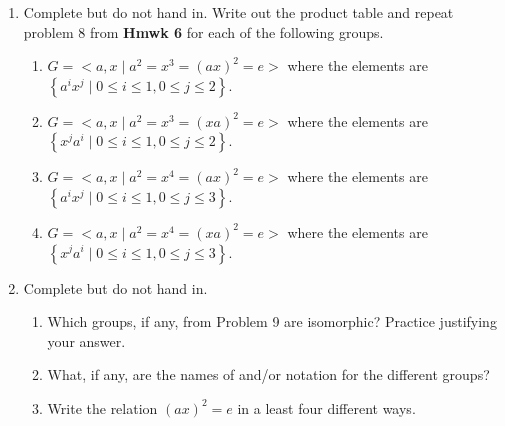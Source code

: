 \begin{enumerate}
  \newpage
  \item Complete but do not hand in. Write out the product table and repeat problem 8 from \textbf{Hmwk 6} for each of the following groups.
  \begin{enumerate}
    \item $G=<a, x \mid a^{2}=x^{3}=(a x)^{2}=e>$ where the elements are $\left\{a^{i} x^{j} \mid 0 \leq i \leq 1,0 \leq j \leq 2\right\}$.
    \begin{subanswer}
      
    \end{subanswer}
    \item $G=<a, x \mid a^{2}=x^{3}=(x a)^{2}=e>$ where the elements are $\left\{x^{j} a^{i} \mid 0 \leq i \leq 1,0 \leq j \leq 2\right\}$.
    \begin{subanswer}
      
    \end{subanswer}
    \item $G=<a, x \mid a^{2}=x^{4}=(a x)^{2}=e>$ where the elements are $\left\{a^{i} x^{j} \mid 0 \leq i \leq 1,0 \leq j \leq 3\right\}$.
    \begin{subanswer}
      
    \end{subanswer}
    \item $G=<a, x \mid a^{2}=x^{4}=(x a)^{2}=e>$ where the elements are $\left\{x^{j} a^{i} \mid 0 \leq i \leq 1,0 \leq j \leq 3\right\}$.
    \begin{subanswer}
      
    \end{subanswer}
  \end{enumerate}
  \item Complete but do not hand in.
  \begin{enumerate}
    \item Which groups, if any, from Problem 9 are isomorphic? Practice justifying your answer.
    \begin{subanswer}
      
    \end{subanswer}
    \item What, if any, are the names of and/or notation for the different groups?
    \begin{subanswer}
      
    \end{subanswer}
    \item Write the relation $(a x)^{2}=e$ in a least four different ways.
    \begin{subanswer}
      
    \end{subanswer}
  \end{enumerate}
\end{enumerate}






































